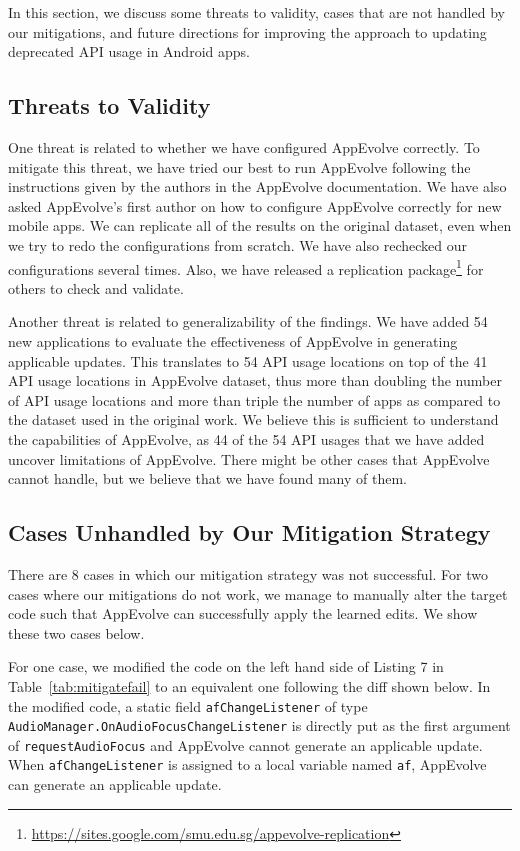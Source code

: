 In this section, we discuss some threats to validity, cases that are not
handled by our mitigations, and future directions for improving the
approach to updating deprecated API usage in Android apps.

\subsection{Threats to Validity}

One threat is related to whether we have configured AppEvolve correctly. To mitigate this threat, we have tried our best to run AppEvolve following the instructions given by the authors in the AppEvolve documentation. We have also asked AppEvolve's first author on how to configure AppEvolve correctly for new mobile apps. We can replicate all of the results on the original dataset, even when we try to redo the configurations from scratch.  We have also rechecked our configurations several times. Also, we have released a replication package\footnote{\url{https://sites.google.com/smu.edu.sg/appevolve-replication}} for others to check and validate.

Another threat is related to generalizability of the findings. We have added 54 new applications to evaluate the effectiveness of
AppEvolve in generating applicable updates. This translates to 54 API usage
locations on top of the 41 API usage locations in AppEvolve dataset, thus
more than doubling the number of API usage locations and more than triple the number of apps as compared to the dataset used in the original work. We
believe this is sufficient to understand the capabilities of AppEvolve, as
44 of the 54 API usages that we have added uncover limitations of
AppEvolve. There might be other cases that AppEvolve cannot handle, but we
believe that we have found many of them.


\subsection{Cases Unhandled by Our Mitigation Strategy}

There are 8 cases in which our mitigation strategy was not successful. For two cases where our mitigations do not work, we manage to manually alter the target code such that
AppEvolve can successfully apply the learned edits. We show these two cases below.

For one case, we modified the code on the left hand side of Listing 7 in Table~\ref{tab:mitigatefail} to an equivalent one following the diff shown below. In the modified code, a static field {\tt afChangeListener} of type {\tt AudioManager.OnAudioFocusChangeListener} is directly put as the first argument of {\tt requestAudioFocus} and AppEvolve cannot generate an applicable update. When {\tt afChangeListener} is assigned to a local variable named {\tt af}, AppEvolve can generate an applicable update.

